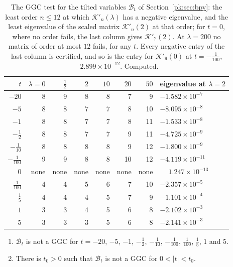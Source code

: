 \begin{table}[htbp]
\centering\footnotesize
\begin{tabular}{rrrrrrrl}
\toprule
$t$ & $\lambda=0$ & $\frac12$ & $2$ & $10$ & $20$ & $50$ & eigenvalue at $\lambda=2$\\
\midrule
$-20$ & 8 & 9 & 8 & 8 & 7 & 9 & $-1.582\times10^{-7}$\\
$-5$ & 8 & 8 & 7 & 7 & 8 & 10 & $-8.095\times10^{-8}$\\
$-1$ & 8 & 8 & 7 & 7 & 8 & 11 & $-1.533\times10^{-8}$\\
$-\frac12$ & 8 & 8 & 7 & 7 & 9 & 11 & $-4.725\times10^{-9}$\\
$-\frac1{10}$ & 8 & 8 & 8 & 8 & 9 & 12 & $-1.800\times10^{-9}$\\
$-\frac1{100}$ & 9 & 9 & 8 & 8 & 10 & 12 & $-4.119\times10^{-11}$\\
$0$ & none & none & none & none & none & none & $\phantom{-}1.247\times10^{-13}$\\
$\frac1{100}$ & 4 & 4 & 5 & 6 & 7 & 10 & $-2.357\times10^{-5}$\\
$\frac15$ & 4 & 4 & 4 & 5 & 7 & 9 & $-1.101\times10^{-4}$\\
$1$ & 3 & 3 & 4 & 5 & 6 & 8 & $-2.102\times10^{-3}$\\
$5$ & 3 & 3 & 3 & 5 & 6 & 8 & $-2.141\times10^{-3}$\\
\bottomrule
\end{tabular}
\caption{The GGC test for the tilted variables $\mathcal B_t$ of Section~\ref{pk:sec:bpy}: the least order $n\le12$ at which $\mathcal K'_n(\lambda)$ has a negative eigenvalue, and the least eigenvalue of the scaled matrix $\mathcal K'_n(2)$ at that order; for $t=0$, where no order fails, the last column gives $\mathcal K'_7(2)$. At $\lambda=200$ no matrix of order at most $12$ fails, for any $t$. Every negative entry of the last column is certified, and so is the entry for $\mathcal K'_9(0)$ at $t=-\frac1{100}$, $-2.899\times10^{-12}$. Computed.}
\label{pk:tab:tilt}
\end{table}

\begin{proposition}\label{pk:prop:bpytilt}
\begin{enumerate}
\item[(i)] $\mathcal B_t$ is not a GGC for $t=-20$, $-5$, $-1$, $-\frac12$, $-\frac1{10}$, $-\frac1{100}$, $\frac1{100}$, $\frac15$, $1$ and $5$.
\item[(ii)] There is $t_0>0$ such that $\mathcal B_t$ is not a GGC for $0<|t|<t_0$.
\end{enumerate}
\end{proposition}

